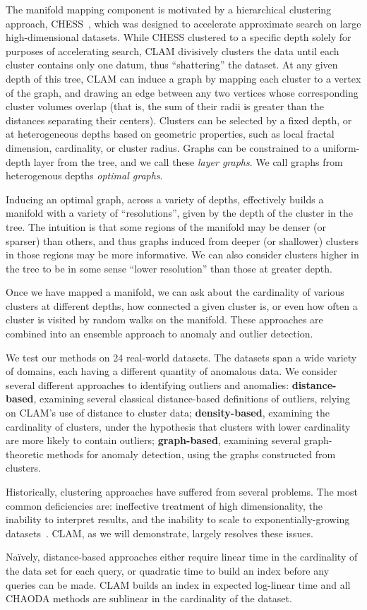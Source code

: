 The manifold mapping component is motivated by a hierarchical clustering approach, CHESS~\cite{ishaq2019clustered}, which was designed to accelerate approximate search on large high-dimensional datasets.
While CHESS clustered to a specific depth solely for purposes of accelerating search, CLAM
divisively clusters the data until each cluster contains only one datum, thus ``shattering'' the dataset.
At any given depth of this tree, CLAM can induce a graph by mapping each cluster to a vertex of the graph, and drawing an edge between any two vertices whose corresponding cluster volumes overlap (that is, the sum of their radii is greater than the distances separating their centers).
Clusters can be selected by a fixed depth, or at heterogeneous depths based on geometric properties, such as local fractal dimension, cardinality, or cluster radius.
Graphs can be constrained to a uniform-depth layer from the tree, and we call these \textit{layer graphs}.
We call graphs from heterogenous depths \textit{optimal graphs}.

Inducing an optimal graph, across a variety of depths, effectively builds a manifold with a variety of ``resolutions'', given by the depth of the cluster in the tree. The intuition is that some regions of the manifold may be denser (or sparser) than others, and thus graphs induced from deeper (or shallower) clusters in those regions may be more informative.
We can also consider clusters higher in the tree to be in some sense ``lower resolution'' than those at greater depth.

Once we have mapped a manifold, we can ask about the cardinality of various clusters at different depths, how connected a given cluster is, or even how often a cluster is visited by random walks on the manifold.
These approaches are combined into an ensemble approach to anomaly and outlier detection.

We test our methods on 24 real-world datasets.
The datasets span a wide variety of domains, each having a different quantity of anomalous data.
We consider several different approaches to identifying outliers and anomalies:
\textbf{distance-based}, examining several classical distance-based definitions of outliers, relying on CLAM's use of distance to cluster data;
\textbf{density-based}, examining the cardinality of clusters, under the hypothesis that clusters with lower cardinality are more likely to contain outliers;
\textbf{graph-based}, examining several graph-theoretic methods for anomaly detection, using the graphs constructed from clusters.

Historically, clustering approaches have suffered from several problems.
The most common deficiencies are: ineffective treatment of high dimensionality, the inability to interpret results, and the inability to scale to exponentially-growing datasets~\cite{agrawal1998automatic}.
CLAM, as we will demonstrate, largely resolves these issues.

Na\"ively, distance-based approaches either require linear time in the cardinality of the data set for each query,
or quadratic time to build an index before any queries can be made.
CLAM builds an index in expected log-linear time and all CHAODA methods are sublinear in the cardinality of the dataset.
